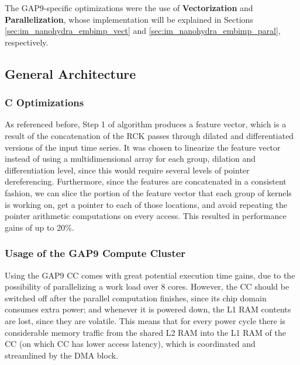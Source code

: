         The GAP9-specific optimizations were the use of \textbf{Vectorization} and \textbf{Parallelization}, whose implementation will be explained in Sections \ref{sec:im_nanohydra_embimp_vect} and \ref{sec:im_nanohydra_embimp_paral}, respectively.

        \subsection{General Architecture}\label{sec:im_nanohydra_embimp_genopt}

        \subsubsection{C Optimizations}
        As referenced before, Step 1 of algorithm produces a feature vector, which is a result of the concatenation of the RCK passes through dilated and differentiated versions of the input time series. It was chosen to linearize
        the feature vector instead of using a multidimensional array for each group, dilation and differentiation level, since this would require several levels of pointer dereferencing. Furthermore, since the features are concatenated in 
        a consistent fashion, we can slice the portion of the feature vector that each group of kernels is working on, get a pointer to each of those locations, and avoid repeating the pointer arithmetic computations on every access. This resulted
        in performance gains of up to 20\%.

        \subsubsection{Usage of the GAP9 Compute Cluster}\label{sec:im_nanohydra_usage_cc}
        Using the GAP9 CC comes with great potential execution time gains, due to the possibility of parallelizing a work load over 8 cores. However, the CC should be switched off after the parallel computation finishes, since
        its chip domain consumes extra power; and whenever it is powered down, the L1 RAM contents are lost, since they are volatile. This means that for every power cycle there is considerable memory traffic from the shared L2 RAM into
        the L1 RAM of the CC (on which CC has lower access latency), which is coordinated and streamlined by the DMA block.

